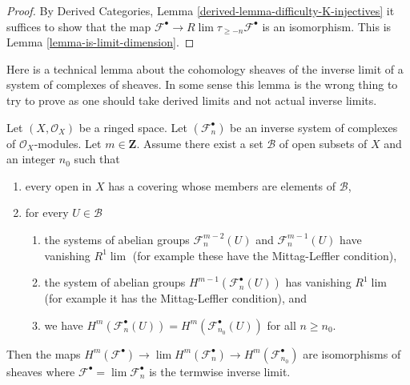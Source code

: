\begin{proof}
By Derived Categories, Lemma \ref{derived-lemma-difficulty-K-injectives}
it suffices to show that the map
$\mathcal{F}^\bullet \to R\lim \tau_{\geq -n} \mathcal{F}^\bullet$
is an isomorphism. This is Lemma \ref{lemma-is-limit-dimension}.
\end{proof}

\noindent
Here is a technical lemma about the cohomology sheaves of the inverse
limit of a system of complexes of sheaves. In some sense this lemma
is the wrong thing to try to prove as one should take derived
limits and not actual inverse limits.

\begin{lemma}
\label{lemma-inverse-limit-complexes}
Let $(X, \mathcal{O}_X)$ be a ringed space. Let $(\mathcal{F}_n^\bullet)$
be an inverse system of complexes of $\mathcal{O}_X$-modules.
Let $m \in \mathbf{Z}$. Assume there exist a set $\mathcal{B}$
of open subsets of $X$ and an integer $n_0$ such that
\begin{enumerate}
\item every open in $X$ has a covering whose members are
elements of $\mathcal{B}$,
\item for every $U \in \mathcal{B}$
\begin{enumerate}
\item the systems of abelian groups
$\mathcal{F}_n^{m - 2}(U)$ and $\mathcal{F}_n^{m - 1}(U)$
have vanishing $R^1\lim$ (for example these have the Mittag-Leffler
condition),
\item the system of abelian groups $H^{m - 1}(\mathcal{F}_n^\bullet(U))$
has vanishing $R^1\lim$ (for example it has the Mittag-Leffler condition), and
\item we have
$H^m(\mathcal{F}_n^\bullet(U)) = H^m(\mathcal{F}_{n_0}^\bullet(U))$
for all $n \geq n_0$.
\end{enumerate}
\end{enumerate}
Then the maps
$H^m(\mathcal{F}^\bullet) \to \lim H^m(\mathcal{F}_n^\bullet) \to
H^m(\mathcal{F}_{n_0}^\bullet)$
are isomorphisms of sheaves where
$\mathcal{F}^\bullet = \lim \mathcal{F}_n^\bullet$ is the termwise
inverse limit.
\end{lemma}

